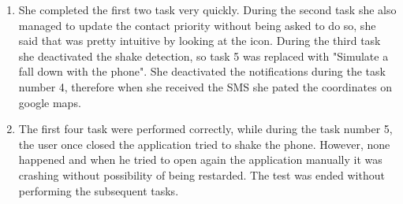\documentclass[12pt]{article}
\begin{document}
\begin{enumerate}
    \item She completed the first two task very quickly. During the second task she 
    also managed to update the contact priority without being asked to do so, 
    she said that was pretty intuitive by looking at the icon. During the third task 
    she deactivated the shake detection, so task 5 was replaced with "Simulate a 
    fall down with the phone". She deactivated the 
    notifications during the task number 4, therefore when she received the SMS 
    she pated the coordinates on google maps.

    \item The first four task were performed correctly, while during the 
    task number 5, the user once closed the application tried to shake the phone.
    However, none happened and when he tried to open again the application 
    manually it was crashing without possibility of being restarded. The 
    test was ended without performing the subsequent tasks.

\end{enumerate}
\end{document}
